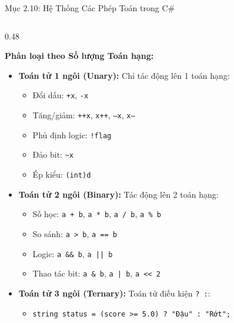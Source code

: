 \documentclass[aspectratio=169, 10pt]{beamer}
\begin{document}
\begin{frame}{Mục 2.10: Hệ Thống Các Phép Toán trong C\#}
  \begin{columns}[T]
    \begin{column}{0.48\textwidth}
      \begin{block}{\textbf{Phân loại theo Số lượng Toán hạng:}}
        \begin{itemize}\small
          \item \textbf{Toán tử 1 ngôi (Unary):} Chỉ tác động lên 1 toán hạng:
            \begin{itemize}\footnotesize
              \item Đổi dấu: \texttt{+x}, \texttt{-x}
              \item Tăng/giảm: \texttt{++x}, \texttt{x++}, \texttt{--x}, \texttt{x--}
              \item Phủ định logic: \texttt{!flag}
              \item Đảo bit: \texttt{\textasciitilde x}
              \item Ép kiểu: \texttt{(int)d}
            \end{itemize}
          \item \textbf{Toán tử 2 ngôi (Binary):} Tác động lên 2 toán hạng:
            \begin{itemize}\footnotesize
              \item Số học: \texttt{a + b}, \texttt{a * b}, \texttt{a / b}, \texttt{a \% b}
              \item So sánh: \texttt{a > b}, \texttt{a == b}
              \item Logic: \texttt{a \&\& b}, \texttt{a || b}
              \item Thao tác bit: \texttt{a \& b}, \texttt{a | b}, \texttt{a << 2}
            \end{itemize}
          \item \textbf{Toán tử 3 ngôi (Ternary):} Toán tử điều kiện \texttt{? :}:
            \begin{itemize}\footnotesize
              \item \texttt{string status = (score >= 5.0) ? "Đậu" : "Rớt";}
            \end{itemize}
        \end{itemize}
      \end{block}
    \end{column}


\end{columns}
\end{frame}
\end{document}
